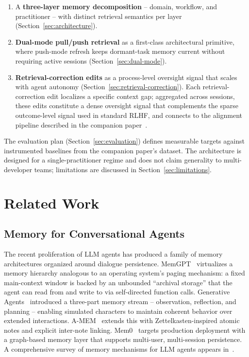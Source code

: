 \documentclass[11pt]{article}
\begin{document}
\begin{enumerate}[leftmargin=*, nosep]
  \item A \textbf{three-layer memory decomposition} -- domain, workflow, and practitioner -- with distinct retrieval semantics per layer (Section~\ref{sec:architecture}).
  \item \textbf{Dual-mode pull/push retrieval} as a first-class architectural primitive, where push-mode refresh keeps dormant-task memory current without requiring active sessions (Section~\ref{sec:dual-mode}).
  \item \textbf{Retrieval-correction edits} as a process-level oversight signal that scales with agent autonomy (Section~\ref{sec:retrieval-correction}). Each retrieval-correction edit localizes a specific context gap; aggregated across sessions, these edits constitute a dense oversight signal that complements the sparse outcome-level signal used in standard RLHF, and connects to the alignment pipeline described in the companion paper~\citep{ovcharov2026recursive}.
\end{enumerate}

The evaluation plan (Section~\ref{sec:evaluation}) defines measurable targets against instrumented baselines from the companion paper's dataset.
The architecture is designed for a single-practitioner regime and does not claim generality to multi-developer teams; limitations are discussed in Section~\ref{sec:limitations}.


\section{Related Work}
\label{sec:related}

\subsection{Memory for Conversational Agents}
\label{sec:related-memory}

The recent proliferation of LLM agents has produced a family of memory architectures organized around dialogue persistence.
MemGPT~\citep{packer2023memgpt} virtualizes a memory hierarchy analogous to an operating system's paging mechanism: a fixed main-context window is backed by an unbounded ``archival storage'' that the agent can read from and write to via self-directed function calls.
Generative Agents~\citep{park2023generative} introduced a three-part memory stream -- observation, reflection, and planning -- enabling simulated characters to maintain coherent behavior over extended interactions.
A-MEM~\citep{xu2024amem} extends this with Zettelkasten-inspired atomic notes and explicit inter-note linking.
Mem0~\citep{chhikara2025mem0} targets production deployment with a graph-based memory layer that supports multi-user, multi-session persistence.
A comprehensive survey of memory mechanisms for LLM agents appears in~\citet{zhang2024survey}.
\end{document}
